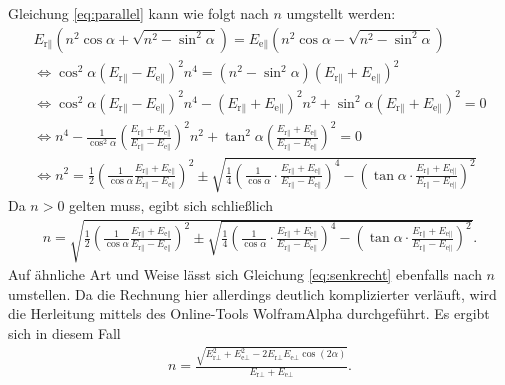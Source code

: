 \noindent
Gleichung \eqref{eq:parallel} kann wie folgt nach $n$ umgstellt werden:
\begin{gather}
    \nonumber E_{\text{r}\parallel} \left(n^2 \cos\alpha + \sqrt{n^2 - \sin^2\alpha}\right) 
    = E_{\text{e}\parallel} \left(n^2 \cos\alpha - \sqrt{n^2 - \sin^2\alpha}\right) \\
%
    \nonumber \iff \cos^2\alpha \left(E_{\text{r}\parallel} - E_{\text{e}\parallel}\right)^2 n^4 
    = \left(n^2 - \sin^2\alpha\right) \left(E_{\text{r}\parallel} + E_{\text{e}\parallel}\right)^2 \\
%
    \nonumber \iff \cos^2\alpha \left(E_{\text{r}\parallel} - E_{\text{e}\parallel}\right)^2 n^4
    - \left(E_{\text{r}\parallel} + E_{\text{e}\parallel}\right)^2 n^2 
    + \sin^2\alpha \left(E_{\text{r}\parallel} + E_{\text{e}\parallel}\right)^2  = 0\\ 
%
    \nonumber \iff n^4 - \frac{1}{\cos^2\alpha} \left(\frac{E_{\text{r}\parallel} + E_{\text{e}\parallel}}
    {E_{\text{r}\parallel} - E_{\text{e}\parallel}}\right)^2 n^2
    + \tan^2\alpha \left(\frac{E_{\text{r}\parallel} + E_{\text{e}\parallel}}
    {E_{\text{r}\parallel} - E_{\text{e}\parallel}}\right)^2 = 0\\
%
    \nonumber \iff n^2 = \frac{1}{2} \left(\frac{1}{\cos\alpha} 
    \frac{E_{\text{r}\parallel} + E_{\text{e}\parallel}}{E_{\text{r}\parallel} - E_{\text{e}\parallel}}\right)^2
    \pm \sqrt{\frac{1}{4} \left(\frac{1}{\cos\alpha} \cdot
    \frac{E_{\text{r}\parallel} + E_{\text{e}\parallel}}{E_{\text{r}\parallel} - E_{\text{e}\parallel}}\right)^4
    - \left(\tan\alpha \cdot \frac{E_{\text{r}\parallel} + E_{\text{e}\parallel}}
    {E_{\text{r}\parallel} - E_{\text{e}\parallel}}\right)^2}
\end{gather} 
Da $n > 0$ gelten muss, egibt sich schließlich
\begin{align}
    n = \sqrt{\frac{1}{2} \left(\frac{1}{\cos\alpha} 
    \frac{E_{\text{r}\parallel} + E_{\text{e}\parallel}}{E_{\text{r}\parallel} - E_{\text{e}\parallel}}\right)^2
    \pm \sqrt{\frac{1}{4} \left(\frac{1}{\cos\alpha} \cdot
    \frac{E_{\text{r}\parallel} + E_{\text{e}\parallel}}{E_{\text{r}\parallel} - E_{\text{e}\parallel}}\right)^4
    - \left(\tan\alpha \cdot \frac{E_{\text{r}\parallel} + E_{\text{e}\parallel}}
    {E_{\text{r}\parallel} - E_{\text{e}\parallel}}\right)^2}}.
    \label{eq:n_parallel}
\end{align}
Auf ähnliche Art und Weise lässt sich Gleichung \eqref{eq:senkrecht} ebenfalls nach $n$ umstellen.
Da die Rechnung hier allerdings deutlich komplizierter verläuft, wird die Herleitung mittels des Online-Tools WolframAlpha \cite{wolfram_n}
durchgeführt.
Es ergibt sich in diesem Fall
\begin{align}
    n = \frac{\sqrt{E_{\text{r}\perp}^2 + E_{\text{e}\perp}^2 - 2 E_{\text{r}\perp} E_{\text{e}\perp} \cos(2\alpha)}}
    {E_{\text{r}\perp} + E_{\text{e}\perp}}.
    \label{eq:n_senkrecht}
\end{align}


